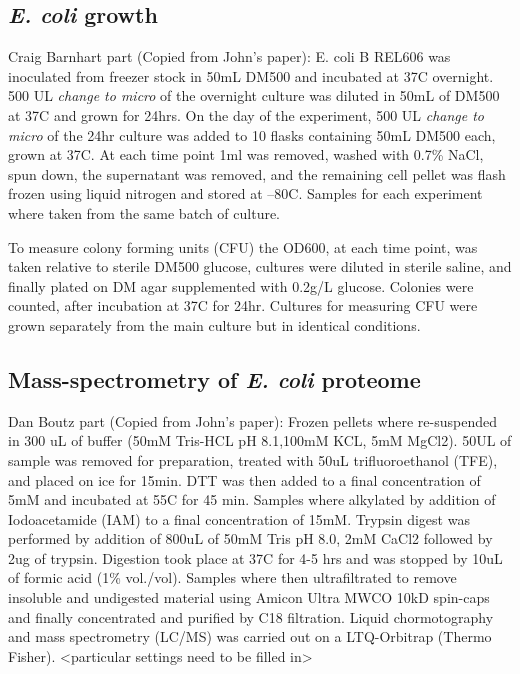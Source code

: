 \documentclass[12pt]{article}
\begin{document}
\subsection{\emph{E. coli} growth} 
Craig Barnhart part (Copied from John’s paper):
E. coli B REL606 was inoculated from freezer stock in 50mL DM500 and incubated at 37C overnight. 500 UL \emph{change to micro} of the overnight culture was diluted in 50mL of DM500 at 37C and grown for 24hrs. On the day of the experiment, 500 UL \emph{change to micro} of the 24hr culture was added to 10 flasks containing 50mL DM500 each, grown at 37C. At each time point 1ml was removed, washed with 0.7\% NaCl, spun down, the supernatant was removed, and the remaining cell pellet was flash frozen using liquid nitrogen and stored at –80C. Samples for each experiment where taken from the same batch of culture. 

To measure colony forming units (CFU) the OD600, at each time point, was taken relative to sterile DM500 glucose, cultures were diluted in sterile saline, and finally plated on DM agar supplemented with 0.2g/L glucose. Colonies were counted, after incubation at 37C for 24hr. Cultures for measuring CFU were grown separately from the main culture but in identical conditions. 

\subsection{Mass-spectrometry of \emph{E. coli} proteome} 
Dan Boutz part (Copied from John’s paper):
Frozen pellets where re-suspended in 300 uL of buffer (50mM Tris-HCL pH 8.1,100mM KCL, 5mM MgCl2). 50UL of sample was removed for preparation, treated with 50uL trifluoroethanol (TFE), and placed on ice for 15min. DTT was then added to a final concentration of 5mM and incubated at 55C for 45 min. Samples where alkylated by addition of Iodoacetamide (IAM) to a final concentration of 15mM. Trypsin digest was performed by addition of 800uL of 50mM Tris pH 8.0, 2mM CaCl2 followed by 2ug of trypsin. Digestion took place at 37C for 4-5 hrs and was stopped by 10uL of formic acid (1\% vol./vol). Samples where then ultrafiltrated to remove insoluble and undigested material using Amicon Ultra MWCO 10kD spin-caps and finally concentrated and purified by C18 filtration. 
Liquid chormotography and mass spectrometry (LC/MS) was carried out on a LTQ-Orbitrap (Thermo Fisher). <particular settings need to be filled in>
\end{document}
